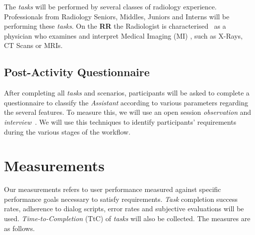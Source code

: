 The \textit{tasks} will be performed by several classes of radiology experience. Professionals from Radiology Seniors, Middles, Juniors and Interns will be performing these \textit{tasks}. On the \textbf{RR} the Radiologist is characterised~\cite{ehrlich2016patient, miglioretti2007radiologist} as a physician who examines and interpret Medical Imaging (MI) \cite{kobashi2017evaluation}, such as X-Rays, CT Scans or MRIs.



\subsection{Post-Activity Questionnaire}

After completing all \textit{tasks} and scenarios, participants will be asked to complete a questionnaire to classify the \textit{Assistant} according to various parameters regarding the several features. To measure this, we will use an open session \textit{observation} and \textit{interview}~\cite{carayon2015systematic}. We will use this techniques to identify participants' requirements during the various stages of the workflow.













\section{Measurements}
\label{sec:sec020}

Our measurements refers to user performance measured against specific performance goals necessary to satisfy requirements. \textit{Task} completion success rates, adherence to dialog scripts, error rates and subjective evaluations will be used. \textit{Time-to-Completion} (TtC) of \textit{tasks} will also be collected. The measures are as follows.

\hfill


